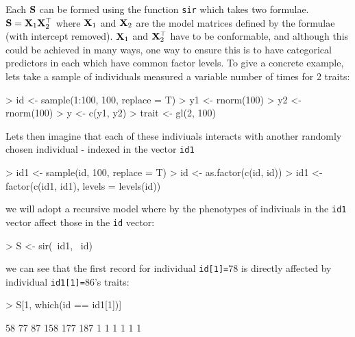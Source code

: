 \documentclass{article}
\begin{document}
Each ${\bf S}$ can be formed using the function \texttt{sir} which takes two formulae. ${\bf S} = {\bf X}_{1}{\bf X}_{2}^{\top}$ where ${\bf X}_{1}$ and ${\bf X}_{2}$ are the model matrices defined by the formulae (with intercept removed).  ${\bf X}_{1}$ and ${\bf X}_{2}^{\top}$ have to be conformable, and although this could be achieved in many ways, one way to ensure this is to have categorical predictors in each which have common factor levels.  To give a concrete example, lets take a sample of individuals measured a variable number of times for 2 traits: 

\begin{Schunk}
\begin{Sinput}
> id <- sample(1:100, 100, replace = T)
> y1 <- rnorm(100)
> y2 <- rnorm(100)
> y <- c(y1, y2)
> trait <- gl(2, 100)
\end{Sinput}
\end{Schunk}


Lets then imagine that each of these indiviuals interacts with another randomly chosen individual - indexed in the vector \texttt{id1}

\begin{Schunk}
\begin{Sinput}
> id1 <- sample(id, 100, replace = T)
> id <- as.factor(c(id, id))
> id1 <- factor(c(id1, id1), levels = levels(id))
\end{Sinput}
\end{Schunk}

we will adopt a recursive model where by the phenotypes of indiviuals in the \texttt{id1} vector affect those in the \texttt{id} vector:

\begin{Schunk}
\begin{Sinput}
> S <- sir(~id1, ~id)
\end{Sinput}
\end{Schunk}

we can see that the first record for individual \texttt{id[1]=}78 is directly affected by individual \texttt{id1[1]=}86's traits:

\begin{Schunk}
\begin{Sinput}
> S[1, which(id == id1[1])]
\end{Sinput}
\begin{Soutput}
 58  77  87 158 177 187 
  1   1   1   1   1   1 
\end{Soutput}
\end{Schunk}
\end{document}
